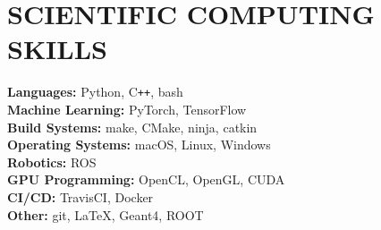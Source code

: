 \section{\small{SCIENTIFIC COMPUTING \\ SKILLS}}

\textbf{Languages:} \hfill Python, C\verb!++!, bash\\
\textbf{Machine Learning:} \hfill PyTorch, TensorFlow\\
\textbf{Build Systems:} \hfill make, CMake, ninja, catkin\\
\textbf{Operating Systems:} \hfill macOS, Linux, Windows\\
\textbf{Robotics:} \hfill ROS\\
\textbf{GPU Programming:} \hfill OpenCL, OpenGL, CUDA\\
\textbf{CI/CD:} \hfill TravisCI, Docker\\
\textbf{Other:} \hfill git, \LaTeX, Geant4, ROOT

%

